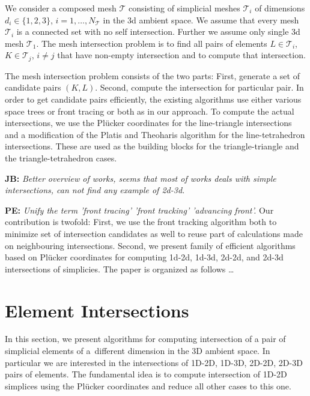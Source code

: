 \documentclass{elsarticle}
\newcommand{\noteJB}[1]{{\color{Blue} \textbf{JB: } \textit{#1}}}
\newcommand{\notePE}[1]{{\color{Orange} \textbf{PE: } \textit{#1}}}
\newcommand{\plucker}{Pl\"{u}cker }
\begin{document}
We consider a composed mesh $\mathcal T$ consisting of simplicial meshes $\mathcal T_i$ of dimensions $d_i \in \{1,2,3\}$, $i=1,\dots,N_\mathcal{T}$
in the 3d ambient space. We assume that every mesh $\mathcal T_i$ is a connected set with no self intersection.
Further we assume only single 3d mesh $\mathcal{T}_1$.
The mesh intersection problem is to find all pairs of elements $L\in \mathcal{T}_i$, $K\in \mathcal{T}_j$, $i\ne j$ that have non-empty intersection 
and to compute that intersection.

The mesh intersection problem consists of the two parts: First, generate a set of candidate pairs $(K, L)$. Second, compute the intersection for particular pair.
In order to get candidate pairs efficiently, the existing algorithms use either various space trees \cite{massing_efficient_2013} or front tracing
\cite{gander_algorithm_2013} or both \cite{elsheikh_reliable_2012} as in our approach. To compute the actual intersections, we 
use the \plucker coordinates for the line-triangle intersections and a modification of the  Platis and Theoharis algorithm \cite{platis_fast_2003}
for the line-tetrahedron intersections. These are used as the building blocks for the triangle-triangle and the triangle-tetrahedron cases.

\noteJB{Better overview of works, seems that most of works deals with simple intersections, can not find any example of 2d-3d.}

\notePE{Unify the term 'front tracing' 'front tracking' 'advancing front'.}
Our contribution is twofold:  First, we use the front tracking algorithm both to minimize set of intersection candidates as well 
to reuse part of calculations made on neighbouring intersections. Second, we present family of efficient algorithms based on \plucker coordinates 
for computing 1d-2d, 1d-3d, 2d-2d, and 2d-3d intersections of simplicies. The paper is organized as follows \dots


\section{Element Intersections}
\label{sec:elements_intersections}
In this section, we present algorithms for computing intersection of a pair of simplicial elements of a~different dimension in the 3D ambient space. 
In particular we are interested in the intersections of 1D-2D, 1D-3D, 2D-2D, 2D-3D pairs of elements. The fundamental idea is to compute intersection of 1D-2D simplices using the 
\plucker coordinates and reduce all other cases to this one. 
\end{document}
